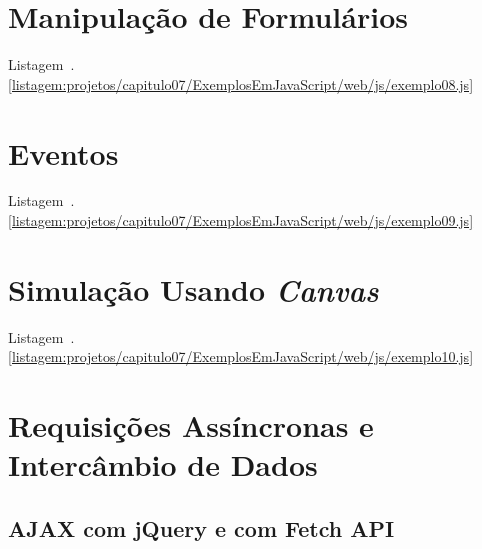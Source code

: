 


\section{Manipulação de Formulários}

Listagem~\thechapter.\ref{listagem:projetos/capitulo07/ExemplosEmJavaScript/web/js/exemplo08.js}




\section{Eventos}

Listagem~\thechapter.\ref{listagem:projetos/capitulo07/ExemplosEmJavaScript/web/js/exemplo09.js}




\section{Simulação Usando \textit{Canvas}}

Listagem~\thechapter.\ref{listagem:projetos/capitulo07/ExemplosEmJavaScript/web/js/exemplo10.js}




\section{Requisições Assíncronas e Intercâmbio de Dados}


\subsection{AJAX com jQuery e com Fetch API}

